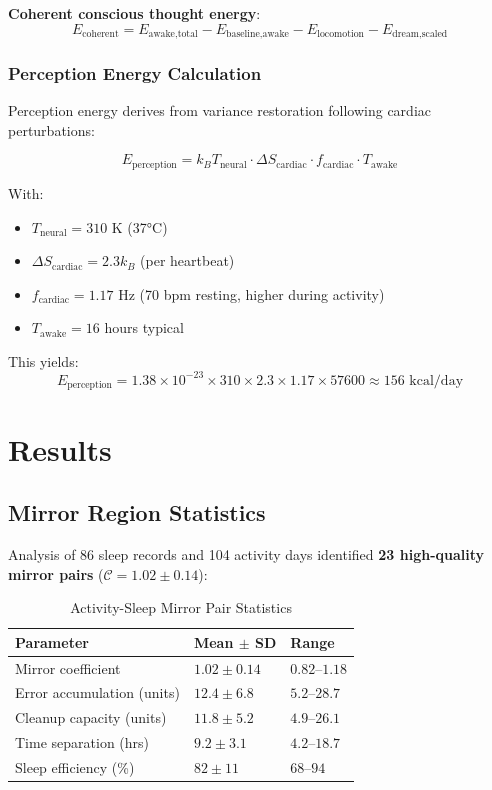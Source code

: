 \documentclass[12pt,twocolumn]{article}
\theoremstyle{remark}
\begin{document}
\textbf{Coherent conscious thought energy}:
\begin{equation}
\boxed{E_{\text{coherent}} = E_{\text{awake,total}} - E_{\text{baseline,awake}} - E_{\text{locomotion}} - E_{\text{dream,scaled}}}
\end{equation}

\subsubsection{Perception Energy Calculation}

Perception energy derives from variance restoration following cardiac perturbations:

\begin{equation}
E_{\text{perception}} = k_B T_{\text{neural}} \cdot \Delta S_{\text{cardiac}} \cdot f_{\text{cardiac}} \cdot T_{\text{awake}}
\end{equation}

With:
\begin{itemize}
\item $T_{\text{neural}} = 310$ K (37°C)
\item $\Delta S_{\text{cardiac}} = 2.3 k_B$ (per heartbeat)
\item $f_{\text{cardiac}} = 1.17$ Hz (70 bpm resting, higher during activity)
\item $T_{\text{awake}} = 16$ hours typical
\end{itemize}

This yields:
\begin{equation}
E_{\text{perception}} = 1.38 \times 10^{-23} \times 310 \times 2.3 \times 1.17 \times 57600 \approx 156 \text{ kcal/day}
\end{equation}

\section{Results}

\subsection{Mirror Region Statistics}

Analysis of 86 sleep records and 104 activity days identified \textbf{23 high-quality mirror pairs} ($\mathcal{C} = 1.02 \pm 0.14$):

\begin{table}[H]
\centering
\caption{Activity-Sleep Mirror Pair Statistics}
\begin{tabular}{@{}lll@{}}
\toprule
\textbf{Parameter} & \textbf{Mean $\pm$ SD} & \textbf{Range} \\
\midrule
Mirror coefficient & $1.02 \pm 0.14$ & $0.82$--$1.18$ \\
Error accumulation (units) & $12.4 \pm 6.8$ & $5.2$--$28.7$ \\
Cleanup capacity (units) & $11.8 \pm 5.2$ & $4.9$--$26.1$ \\
Time separation (hrs) & $9.2 \pm 3.1$ & $4.2$--$18.7$ \\
Sleep efficiency (\%) & $82 \pm 11$ & $68$--$94$ \\
\bottomrule
\end{tabular}
\end{table}
\end{document}
